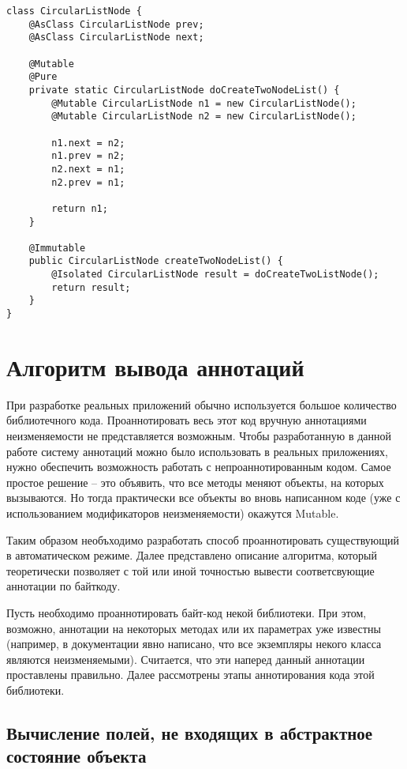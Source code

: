 \begin{lstlisting}[caption=CircularListNode.java, label=code:circular_list_node_isolated]
class CircularListNode {
    @AsClass CircularListNode prev;
    @AsClass CircularListNode next;
    
    @Mutable
    @Pure
    private static CircularListNode doCreateTwoNodeList() {
    	@Mutable CircularListNode n1 = new CircularListNode();
        @Mutable CircularListNode n2 = new CircularListNode();
    	
        n1.next = n2;
        n1.prev = n2;
        n2.next = n1;
        n2.prev = n1;
    
        return n1;  
    }
    
    @Immutable
    public CircularListNode createTwoNodeList() {
        @Isolated CircularListNode result = doCreateTwoListNode();
        return result;
    }
}
\end{lstlisting} 

\section{Алгоритм вывода аннотаций}

При разработке реальных приложений обычно используется большое количество библиотечного кода. Проаннотировать весь этот код вручную аннотациями неизменяемости не представляется возможным. Чтобы разработанную в данной работе систему аннотаций можно было использовать в реальных приложениях, нужно обеспечить возможность работать с непроаннотированным кодом. Самое простое решение -- это объявить, что все методы меняют объекты, на которых вызываются. Но тогда практически все объекты во вновь написанном коде (уже с использованием модификаторов неизменяемости) окажутся Mutable. 

Таким образом необъходимо разработать способ проаннотировать существующий в автоматическом режиме. Далее представлено описание алгоритма, который теоретически позволяет с той или иной точностью вывести соответсвующие аннотации по байткоду. 

Пусть необходимо проаннотировать байт-код некой библиотеки. При этом, возможно, аннотации на некоторых методах или их параметрах уже известны (например, в документации явно написано, что все экземпляры некого класса являются неизменяемыми). Считается, что эти наперед данный аннотации проставлены правильно. Далее рассмотрены этапы аннотирования кода этой библиотеки.

\subsection{Вычисление полей, не входящих в абстрактное состояние объекта}

